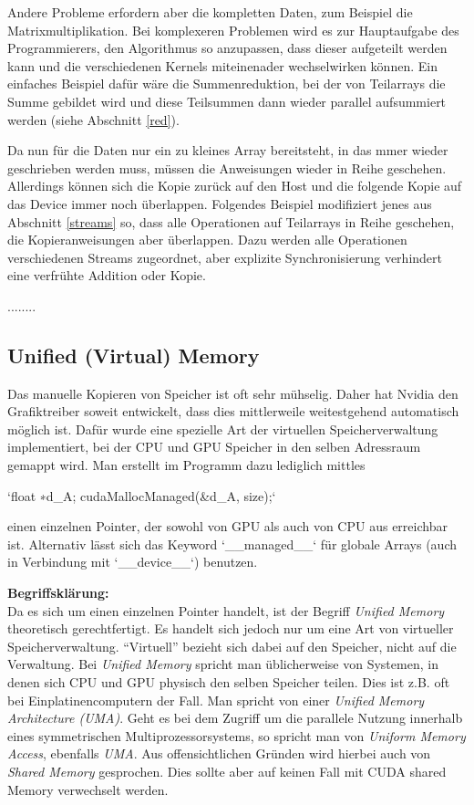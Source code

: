 		Andere Probleme erfordern aber die kompletten Daten, zum Beispiel die Matrixmultiplikation. Bei komplexeren Problemen wird es zur Hauptaufgabe des Programmierers, den Algorithmus so anzupassen, dass dieser aufgeteilt werden kann und die verschiedenen \Glspl{Kernel} miteinenader wechselwirken können. Ein einfaches Beispiel dafür wäre die Summenreduktion, bei der von Teilarrays die Summe gebildet wird und diese Teilsummen dann wieder parallel aufsummiert werden (siehe Abschnitt \ref{red}). 
		
		Da nun für die Daten nur ein zu kleines Array bereitsteht, in das mmer wieder geschrieben werden muss, müssen die Anweisungen wieder in Reihe geschehen. Allerdings können sich die Kopie zurück auf den Host und die folgende Kopie auf das Device immer noch überlappen. Folgendes Beispiel modifiziert jenes aus Abschnitt \ref{streams} so, dass alle Operationen auf Teilarrays in Reihe geschehen, die Kopieranweisungen aber überlappen. Dazu werden alle Operationen verschiedenen \Glspl{Stream} zugeordnet, aber explizite Synchronisierung verhindert eine verfrühte Addition oder Kopie.
		
		........
		
		\subsection*{Unified (Virtual) Memory}
		Das manuelle Kopieren von Speicher ist oft sehr mühselig. Daher hat Nvidia den Grafiktreiber soweit entwickelt, dass dies mittlerweile weitestgehend automatisch möglich ist. Dafür wurde eine spezielle Art der virtuellen Speicherverwaltung implementiert, bei der CPU und GPU Speicher in den selben Adressraum gemappt wird. 
		Man erstellt im Programm dazu lediglich mittles 
		
		\li`float ∗d_A; cudaMallocManaged(&d_A, size);` 
		
		einen einzelnen Pointer, der sowohl von GPU als auch von CPU aus erreichbar ist. Alternativ lässt sich das Keyword \li`__managed__` für globale Arrays (auch in Verbindung mit \li`__device__`) benutzen.
		
		\textbf{Begriffsklärung:}\\
		Da es sich um einen einzelnen Pointer handelt, ist der Begriff \textit{Unified Memory} theoretisch gerechtfertigt. Es handelt sich jedoch nur um eine Art von virtueller Speicherverwaltung. \enquote{Virtuell} bezieht sich dabei auf den Speicher, nicht auf die Verwaltung. Bei \textit{Unified Memory} spricht man üblicherweise von Systemen, in denen sich CPU und GPU physisch den selben Speicher teilen. Dies ist z.B. oft bei Einplatinencomputern der Fall. Man spricht von einer \textit{Unified Memory Architecture (UMA)}. Geht es bei dem Zugriff um die parallele Nutzung innerhalb eines symmetrischen Multiprozessorsystems, so spricht man von \textit{Uniform Memory Access}, ebenfalls \textit{UMA}. Aus offensichtlichen Gründen wird hierbei auch von \textit{Shared Memory} gesprochen. Dies sollte aber auf keinen Fall mit CUDA \Gls{shared Memory} verwechselt werden.
		
